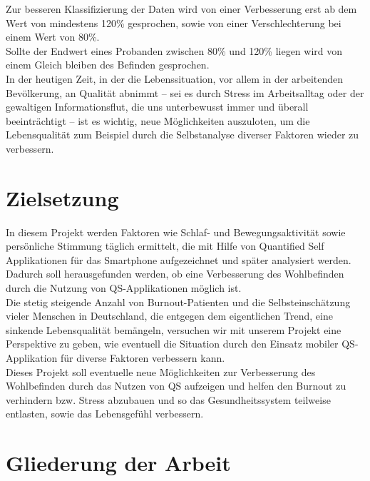 Zur besseren Klassifizierung der Daten wird von einer Verbesserung erst ab dem Wert von mindestens 120\% gesprochen, sowie von einer Verschlechterung bei einem Wert von 80\%. \\Sollte der Endwert eines Probanden zwischen 80\% und 120\% liegen wird von einem Gleich bleiben des Befinden gesprochen.\\ 
In der heutigen Zeit, in der die Lebenssituation, vor allem in der arbeitenden Bevölkerung, an Qualität abnimmt – sei es durch Stress im Arbeitsalltag oder der gewaltigen Informationsflut, die uns unterbewusst immer und überall beeinträchtigt – ist es wichtig, neue Möglichkeiten auszuloten, um die Lebensqualität zum Beispiel durch die Selbstanalyse diverser Faktoren wieder zu verbessern.  

\section{Zielsetzung}
\label{ch:Einleitung:sec:Zielsetzung}

In diesem Projekt werden Faktoren wie Schlaf- und Bewegungsaktivität sowie persönliche Stimmung täglich ermittelt, die mit Hilfe von Quantified Self Applikationen für das Smartphone aufgezeichnet und später analysiert werden. 
Dadurch soll herausgefunden werden, ob eine Verbesserung des Wohlbefinden durch die Nutzung von QS-Applikationen möglich ist. \\
Die stetig steigende Anzahl von Burnout-Patienten und die Selbsteinschätzung vieler Menschen in Deutschland, die entgegen dem eigentlichen Trend, eine sinkende Lebensqualität bemängeln, versuchen wir mit unserem Projekt eine Perspektive zu geben, wie eventuell die Situation durch den Einsatz mobiler QS-Applikation für diverse Faktoren verbessern kann. \\
Dieses Projekt soll eventuelle neue Möglichkeiten zur Verbesserung des Wohlbefinden durch das Nutzen von QS aufzeigen und helfen den Burnout zu verhindern bzw. Stress abzubauen und so das Gesundheitssystem teilweise entlasten, sowie das Lebensgefühl verbessern. 

\section{Gliederung der Arbeit}
\label{ch:Einleitung:sec:GliederungDerArbeit}

